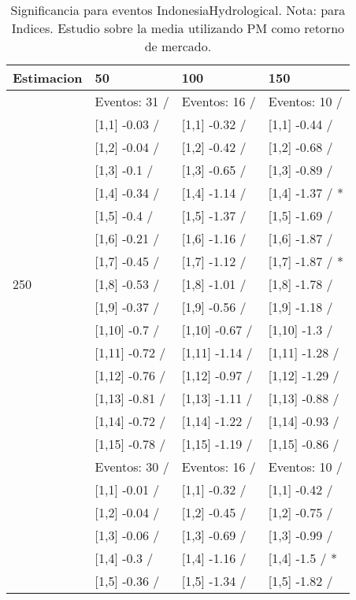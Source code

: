 \begin{table}

\caption{Significancia para eventos IndonesiaHydrological. Nota: para Indices. Estudio sobre la media utilizando PM como retorno de mercado.}
\centering
\begin{tabular}[t]{llll}
\toprule
Estimacion & 50 & 100 & 150\\
\midrule
 & Eventos:  31 / & Eventos:  16 / & Eventos:  10 /\\
 & {}[1,1] -0.03  / & {}[1,1] -0.32  / & {}[1,1] -0.44  /\\
 & {}[1,2] -0.04  / & {}[1,2] -0.42  / & {}[1,2] -0.68  /\\
 & {}[1,3] -0.1  / & {}[1,3] -0.65  / & {}[1,3] -0.89  /\\
 & {}[1,4] -0.34  / & {}[1,4] -1.14  / & {}[1,4] -1.37  / *\\
\addlinespace
 & {}[1,5] -0.4  / & {}[1,5] -1.37  / & {}[1,5] -1.69  /\\
 & {}[1,6] -0.21  / & {}[1,6] -1.16  / & {}[1,6] -1.87  /\\
 & {}[1,7] -0.45  / & {}[1,7] -1.12  / & {}[1,7] -1.87  / *\\
250 & {}[1,8] -0.53  / & {}[1,8] -1.01  / & {}[1,8] -1.78  /\\
 & {}[1,9] -0.37  / & {}[1,9] -0.56  / & {}[1,9] -1.18  /\\
\addlinespace
 & {}[1,10] -0.7  / & {}[1,10] -0.67  / & {}[1,10] -1.3  /\\
 & {}[1,11] -0.72  / & {}[1,11] -1.14  / & {}[1,11] -1.28  /\\
 & {}[1,12] -0.76  / & {}[1,12] -0.97  / & {}[1,12] -1.29  /\\
 & {}[1,13] -0.81  / & {}[1,13] -1.11  / & {}[1,13] -0.88  /\\
 & {}[1,14] -0.72  / & {}[1,14] -1.22  / & {}[1,14] -0.93  /\\
\addlinespace
 & {}[1,15] -0.78  / & {}[1,15] -1.19  / & {}[1,15] -0.86  /\\
 & Eventos:  30 / & Eventos:  16 / & Eventos:  10 /\\
 & {}[1,1] -0.01  / & {}[1,1] -0.32  / & {}[1,1] -0.42  /\\
 & {}[1,2] -0.04  / & {}[1,2] -0.45  / & {}[1,2] -0.75  /\\
 & {}[1,3] -0.06  / & {}[1,3] -0.69  / & {}[1,3] -0.99  /\\
\addlinespace
 & {}[1,4] -0.3  / & {}[1,4] -1.16  / & {}[1,4] -1.5  / *\\
 & {}[1,5] -0.36  / & {}[1,5] -1.34  / & {}[1,5] -1.82  /\\

\end{tabular}
\end{table}
